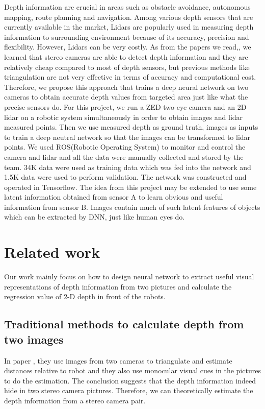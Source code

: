 \documentclass[10pt,twocolumn,letterpaper]{article}
\begin{document}
Depth information are crucial in areas such as obstacle avoidance, autonomous mapping, route planning and navigation. Among various depth sensors that are currently available in the market, Lidars are popularly used in measuring depth information to surrounding environment because of its accuracy, precision and flexibility. However, Lidars can be very costly. As from the papers we read\cite{kyto2011method},\cite{jones2011head}, \cite{diebel2004simultaneous} we learned that stereo cameras are able to detect depth information and they are relatively cheap compared to most of depth sensors, but previous methods like triangulation are not very effective in terms of accuracy and computational cost. Therefore, we propose this approach that trains a deep neural network on two cameras to obtain accurate depth values from targeted area just like what the precise sensors do. For this project, we run a ZED two-eye camera and an 2D lidar on a robotic system simultaneously in order to obtain images and lidar measured points. Then we use measured depth as ground truth, images as inputs to train a deep neutral network so that the images can be transformed to lidar points. We used ROS(Robotic Operating System) to monitor and control the camera and lidar and all the data were manually collected and stored by the team. 34K data were used as training data which was fed into the network and 1.5K data were used to perform validation. The network was constructed and operated in Tensorflow. The idea from this project may be extended to use some latent information obtained from sensor A to learn obvious and useful information from sensor B. Images contain much of such latent features of objects which can be extracted by DNN, just like human eyes do.
\section{Related work}
Our work mainly focus on how to design neural network to extract useful visual representations of depth information from two pictures and calculate the regression value of  2-D depth in front of the robots.
\subsection{Traditional methods to calculate depth from two images}
In paper \cite{saxena2007depth}, they use images from two cameras to triangulate and estimate distances relative to robot and they also use monocular visual cues in the pictures to do the estimation. The conclusion suggests that the depth information indeed hide in two stereo camera pictures. Therefore, we can theoretically estimate the depth information from a stereo camera pair.  
\end{document}
